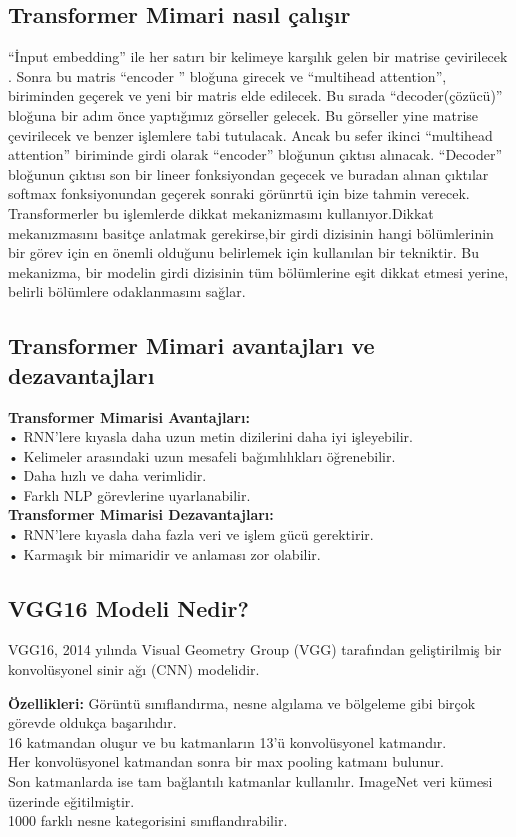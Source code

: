 \documentclass[12pt, a4paper]{article}
\begin{document}
	\subsection{Transformer Mimari nasıl çalışır}
	“İnput embedding” ile her satırı bir kelimeye karşılık gelen bir matrise çevirilecek . Sonra bu matris “encoder ” bloğuna girecek ve “multihead attention”, biriminden  geçerek ve yeni bir matris elde edilecek.
	Bu sırada “decoder(çözücü)” bloğuna bir adım önce yaptığımız görseller gelecek. Bu görseller yine matrise çevirilecek ve benzer işlemlere tabi tutulacak. Ancak bu sefer ikinci “multihead attention” biriminde girdi olarak “encoder” bloğunun çıktısı alınacak. “Decoder” bloğunun çıktısı son bir lineer fonksiyondan geçecek ve buradan alınan çıktılar softmax fonksiyonundan geçerek sonraki görünrtü için bize tahmin verecek.
	Transformerler bu işlemlerde dikkat mekanizmasını kullanıyor.Dikkat mekanızmasını basitçe anlatmak gerekirse,bir girdi dizisinin hangi bölümlerinin bir görev için en önemli olduğunu belirlemek için kullanılan bir tekniktir. Bu mekanizma, bir modelin girdi dizisinin tüm bölümlerine eşit dikkat etmesi yerine, belirli bölümlere odaklanmasını sağlar.
	\subsection{Transformer Mimari avantajları ve dezavantajları}
	\textbf{Transformer Mimarisi Avantajları:}\\
	•	RNN'lere kıyasla daha uzun metin dizilerini daha iyi işleyebilir.\\
	•	Kelimeler arasındaki uzun mesafeli bağımlılıkları öğrenebilir.\\
	•	Daha hızlı ve daha verimlidir.\\
	•	Farklı NLP görevlerine uyarlanabilir.\\
	\textbf{Transformer Mimarisi Dezavantajları:}\\
	•	RNN'lere kıyasla daha fazla veri ve işlem gücü gerektirir.\\
	•	Karmaşık bir mimaridir ve anlaması zor olabilir.\\
	
	\subsection{VGG16 Modeli Nedir?}
	VGG16, 2014 yılında Visual Geometry Group (VGG) tarafından geliştirilmiş bir konvolüsyonel sinir ağı (CNN) modelidir.
	
	\textbf{Özellikleri:} 				
	Görüntü sınıflandırma, nesne algılama ve bölgeleme gibi birçok görevde oldukça başarılıdır.\\
	16 katmandan oluşur ve bu katmanların 13'ü konvolüsyonel katmandır.\\
	Her konvolüsyonel katmandan sonra bir max pooling katmanı bulunur.\\
	Son katmanlarda ise tam bağlantılı katmanlar kullanılır.
	ImageNet veri kümesi üzerinde eğitilmiştir.\\
	1000 farklı nesne kategorisini sınıflandırabilir.\\
	
\end{document}
